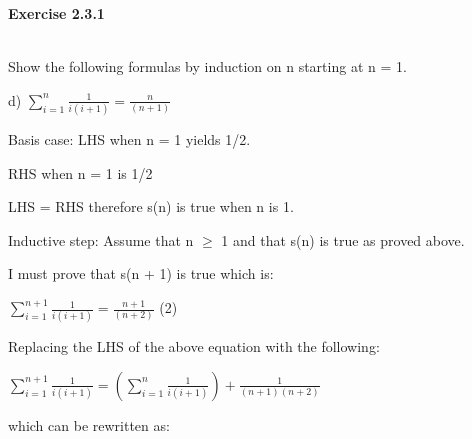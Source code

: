 \documentclass[12pt]{article}
\begin{document}
\begin{title}
    \centering
    {\LARGE\bfseries Exercise 2.3.1}
\end{title}\\

\vspace{10mm} %
Show the following formulas by induction on n starting at n = 1.

\vspace{5mm} %

d) $\sum_{i=1}^{n}\frac{1}{i(i + 1)} = \frac{n}{(n + 1)}$\par

\vspace{5mm} %

Basis case: LHS when n = 1 yields 1/2.\par

\vspace{5mm} %

RHS when n = 1 is 1/2\par

LHS = RHS therefore s(n) is true when n is 1.\par

Inductive step: Assume that n $\geq$ 1 and that s(n) is true as proved above.\par I must prove that s(n + 1) is true which is:\par

\vspace{5mm} %

$\sum_{i=1}^{n + 1}\frac{1}{i(i + 1)} = \frac{n + 1}{(n + 2)}$   \hfil\hfil\hfil (2)\par

\vspace{5mm} %

Replacing the LHS of the above equation with the following:\par

\vspace{5mm} %

$\sum_{i=1}^{n + 1}\frac{1}{i(i + 1)} = (\sum_{i=1}^{n}\frac{1}{i(i + 1)}) + \frac{1}{(n + 1)(n + 2)}$\par

\vspace{5mm} %

which can be rewritten as:\par

\vspace{5mm} %
\end{document}
